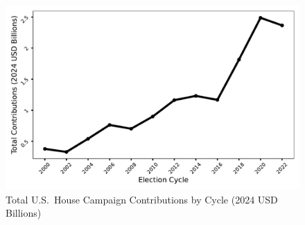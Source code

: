 \begin{figure}[!t]
	\centering
	\includegraphics[width = 0.7\linewidth]{../Figures/cycle_spending_trend.pdf}
	\caption{Total U.S.\ House Campaign Contributions by Cycle (2024 USD Billions)}
	\label{fig:trend}
\end{figure}
